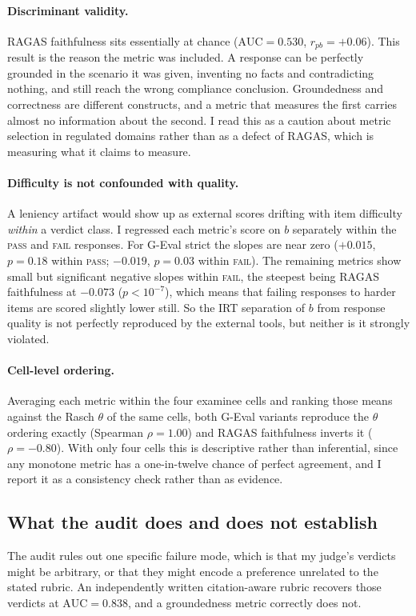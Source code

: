 \paragraph{Discriminant validity.}
RAGAS faithfulness sits essentially at chance
($\mathrm{AUC} = 0.530$, $r_{pb} = +0.06$). This result is the reason the
metric was included. A response can be perfectly grounded in the scenario
it was given, inventing no facts and contradicting nothing, and still
reach the wrong compliance conclusion. Groundedness and correctness are
different constructs, and a metric that measures the first carries almost
no information about the second. I read this as a caution about metric
selection in regulated domains rather than as a defect of RAGAS, which is
measuring what it claims to measure.

\paragraph{Difficulty is not confounded with quality.}
A leniency artifact would show up as external scores drifting with item
difficulty \emph{within} a verdict class. I regressed each metric's score
on $b$ separately within the \textsc{pass} and \textsc{fail} responses.
For G-Eval strict the slopes are near zero ($+0.015$, $p = 0.18$ within
\textsc{pass}; $-0.019$, $p = 0.03$ within \textsc{fail}). The remaining
metrics show small but significant negative slopes within \textsc{fail},
the steepest being RAGAS faithfulness at $-0.073$ ($p < 10^{-7}$), which
means that failing responses to harder items are scored slightly lower
still. So the IRT separation of $b$ from response quality is not
perfectly reproduced by the external tools, but neither is it strongly
violated.

\paragraph{Cell-level ordering.}
Averaging each metric within the four examinee cells and ranking those
means against the Rasch $\theta$ of the same cells, both G-Eval variants
reproduce the $\theta$ ordering exactly (Spearman $\rho = 1.00$) and
RAGAS faithfulness inverts it ($\rho = -0.80$). With only four cells this
is descriptive rather than inferential, since any monotone metric has a
one-in-twelve chance of perfect agreement, and I report it as a
consistency check rather than as evidence.

\subsection{What the audit does and does not establish}
\label{sec:judgeaudit-limits}
The audit rules out one specific failure mode, which is that my judge's
verdicts might be arbitrary, or that they might encode a preference
unrelated to the stated rubric. An independently written citation-aware
rubric recovers those verdicts at $\mathrm{AUC} = 0.838$, and a
groundedness metric correctly does not.

